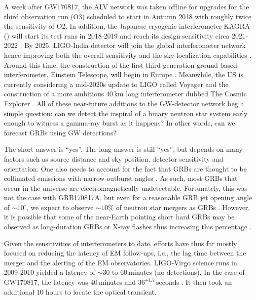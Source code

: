 \documentclass[prd,amsmath,amssymb,aps,floats,amsfonts,notitlepage,superscriptaddress,eqsecnum,nofootinbib,10pt]{revtex4-1}
\begin{document}
A week after GW170817, the ALV network was taken offline for upgrades for the third observation run (O3) 
scheduled to start in Autumn 2018 with roughly twice the sensitivity of O2.
In addition, the Japanese cryogenic interferometer KAGRA (\cite{KAGRA, KAGRA2}) will start its test runs in 2018-2019 and reach its design sensitivity circa 2021-2022 \cite{Akutsu:2017thy, Aasi:2013wya}. By 2025, LIGO-India detector will join the global interferometer network hence improving both the overall sensitivity and the sky-localization capabilities \cite{Aasi:2013wya}.
Around this time, the construction of the first third-generation ground-based interferometer, Einstein Telescope, will begin in Europe \cite{ET_doc}. 
Meanwhile, the US is currently considering a mid-2020s update to LIGO called Voyager \cite{LIGO_Voy} and the construction of a more ambitious 40\,km long interferometer dubbed The Cosmic Explorer \cite{CE}.
All of these near-future additions to the GW-detector network beg a simple question: can we detect the inspiral of a binary neutron star system
early enough to witness a gamma-ray burst as it happens? In other words, can we forecast GRBs using GW detections?

The short answer is ``yes''. The long answer is still ``yes'', but depends on many factors such as source distance and sky position, detector sensitivity and orientation. One also needs to account for the fact that GRBs are thought to be collimated emissions with narrow outburst angles \cite{Kumar:2014upa}.
As such, most GRBs that occur in the universe are electromagnetically undetectable. Fortunately, this was not the case with GRB170817A, 
but even for a reasonable GRB jet opening angle of $\sim 10^\circ$, we expect to observe $\sim 10\%$ of neutron star mergers as GRBs \cite{Patricelli:2016bkt}. 
However, it is possible that some of the near-Earth pointing short hard GRBs may be observed as long-duration GRBs or X-ray flashes thus increasing this percentage \cite{Bucciantini:2011kx}.

Given the sensitivities of interferometers to date, efforts have thus far mostly focused on reducing the latency of EM follow-ups, 
i.e., the lag time between the merger and the alerting of the EM observatories. 
LIGO-Virgo science runs in 2009-2010 yielded a latency of $\sim\!\! 30$ to $60\,$minutes \cite{Abbott:2011ys} (no detections).
In the case of GW170817, the latency was 40\,minutes and $36^{+1.7}\,$seconds \cite{GBM:2017lvd}.
It then took an additional $ 10$ hours to locate the optical transient. %
\end{document}
